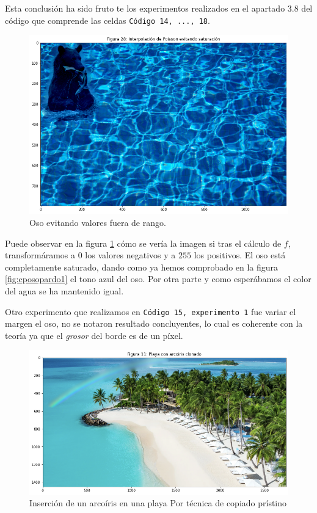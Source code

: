 \documentclass[11pt,twoside,titlepage,a4paper]{article}
\numberwithin{equation}{section} %
\theoremstyle{usual}
\begin{document}
Esta conclusión ha sido fruto te los experimentos realizados en el apartado 3.8 del código que comprende las celdas \texttt{Código 14, ..., 18}. 

\begin{figure}[h]
    \centering
    \includegraphics[width=.7\textwidth]{imagenes/PoissonImageEditing_cell_35_output_0.png}
    \caption{Oso evitando valores fuera de rango. }
    \label{fig:cposoSaturado}
\end{figure}

Puede observar en la figura \ref{fig:cposoSaturado} cómo se vería la imagen si tras el cálculo de $f$, transformáramos a $0$ los valores negativos y a $255$ los positivos.  
El oso está completamente saturado, dando como ya hemos comprobado en la figura \ref{fig:cposopardo1} el tono azul del oso. Por otra parte y como esperábamos el color del agua se ha mantenido igual.  

Otro experimento que realizamos en \texttt{Código 15, experimento 1} fue variar el margen el oso, no se notaron resultado concluyentes, lo cual es coherente con la teoría ya que el \textit{grosor} del borde es de un píxel. 



\begin{figure}[h]
    \centering
    \includegraphics[width=.7\textwidth]{imagenes/PoissonImageEditing_cell_18_output_0.png}
    \caption{Inserción de un arcoíris en una playa Por técnica de copiado prístino}
    \label{fig:arcoirisCopiadoPristino}
\end{figure} 
\end{document}
